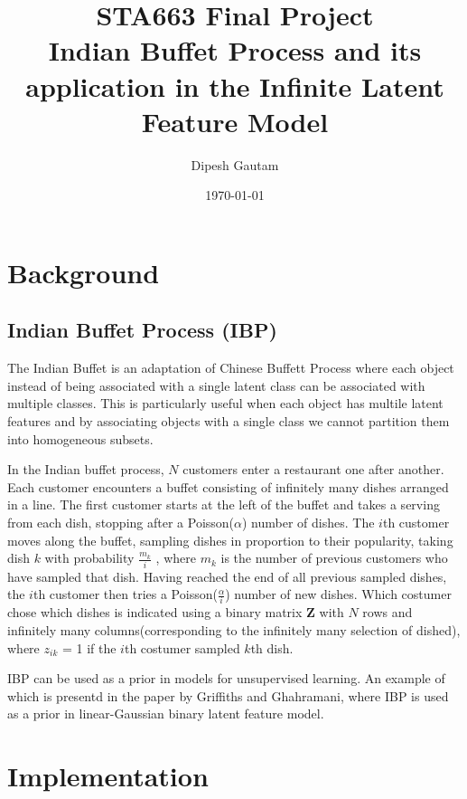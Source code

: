 \documentclass{article}
\begin{document}
\title{STA663 Final Project \\ Indian Buffet Process and its application in the Infinite Latent Feature Model}
\author{Dipesh Gautam}
\date{\today}
\maketitle

\section{Background}
\subsection{Indian Buffet Process (IBP)}
The Indian Buffet is an adaptation of Chinese Buffett Process where each object instead of being associated with a single latent class can  be associated with multiple classes. This is particularly useful when each object has multile latent features and by associating objects with a single class we cannot partition them into homogeneous subsets.

In the Indian buffet process, $N$ customers enter a restaurant one after another. Each customer encounters a buffet 
consisting of infinitely many dishes arranged in a line. The first customer starts at the left of the buffet and 
takes a serving from each dish, stopping after a Poisson($\alpha$) number of dishes. The $i$th customer moves along the buffet, 
sampling dishes in proportion to their popularity, taking dish $k$ with probability $\frac{m_k}{i}$ , where $m_k$ is the number of 
previous customers who have sampled that dish. Having reached the end of all previous sampled dishes, the $i$th customer 
then tries a Poisson($\frac{\alpha}{i}$) number of new dishes. Which costumer chose which dishes is indicated using a binary matrix \textbf{Z} with $N$ rows and infinitely many columns(corresponding to the infinitely many selection of dished), where $z_{ik}$ = 1 if the $i$th costumer sampled $k$th dish.

IBP can be used as a prior in models for unsupervised learning. An example of which is presentd in the paper by Griffiths and Ghahramani, where IBP is used as a prior in linear-Gaussian binary latent feature model.


\section{Implementation}
\end{document}
